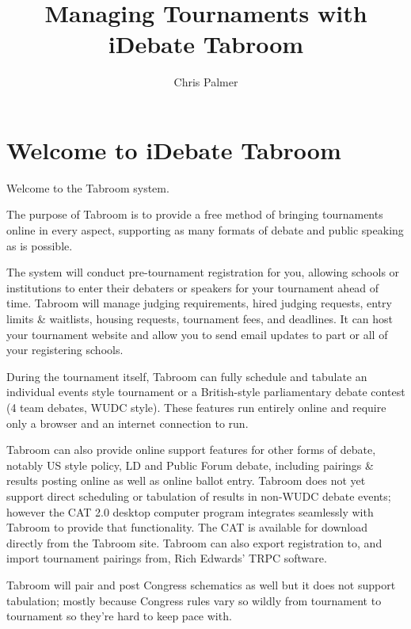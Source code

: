 \documentclass[12pt]{report}
\author{Chris Palmer}
\begin{document}
 
\normalsize

\title{Managing Tournaments with iDebate Tabroom} \maketitle

\date

\tableofcontents

\setlength{\parskip}{\baselineskip}%
\setlength{\parindent}{10pt}%
\newpage
\onehalfspacing

\chapter{Welcome to iDebate Tabroom}

Welcome to the Tabroom system.  

The purpose of Tabroom is to provide a free method of bringing tournaments
online in every aspect, supporting as many formats of debate and public
speaking as is possible.

The system will conduct pre-tournament registration for you, allowing schools
or institutions to enter their debaters or speakers for your tournament ahead
of time.  Tabroom will manage judging requirements, hired judging requests,
entry limits \& waitlists, housing requests, tournament fees, and deadlines.
It can host your tournament website and allow you to send email updates to part
or all of your registering schools.

During the tournament itself, Tabroom can fully schedule and tabulate an
individual events style tournament or a British-style parliamentary debate
contest (4 team debates, WUDC style).  These features run entirely online and
require only a browser and an internet connection to run.

Tabroom can also provide online support features for other forms of debate,
notably US style policy, LD and Public Forum debate, including pairings \&
results posting online as well as online ballot entry.  Tabroom does not yet
support direct scheduling or tabulation of results in non-WUDC debate events;
however the CAT 2.0 desktop computer program integrates seamlessly with Tabroom
to provide that functionality.  The CAT is available for download directly from
the Tabroom site.  Tabroom can also export registration to, and import
tournament pairings from, Rich Edwards' TRPC software.

Tabroom will pair and post Congress schematics as well but it does not support
tabulation; mostly because Congress rules vary so wildly from tournament to
tournament so they're hard to keep pace with.
\end{document}
